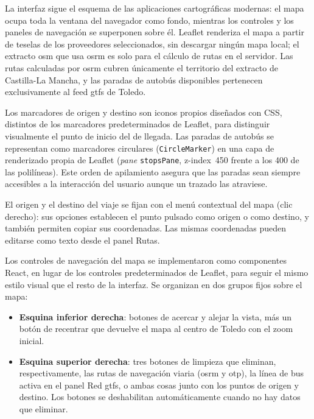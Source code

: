 La interfaz sigue el esquema de las aplicaciones cartográficas modernas: el mapa ocupa toda la ventana del navegador como fondo, mientras los controles y los paneles de navegación se superponen sobre él. Leaflet renderiza el mapa a partir de teselas de los proveedores seleccionados, sin descargar ningún mapa local; el extracto \gls{osm} que usa \gls{osrm} es solo para el cálculo de rutas en el servidor. Las rutas calculadas por \gls{osrm} cubren únicamente el territorio del extracto de Castilla-La Mancha, y las paradas de autobús disponibles pertenecen exclusivamente al feed \gls{gtfs} de Toledo.\newline

Los marcadores de origen y destino son iconos propios diseñados con CSS, distintos de los marcadores predeterminados de Leaflet, para distinguir visualmente el punto de inicio del de llegada. Las paradas de autobús se representan como marcadores circulares (\texttt{CircleMarker}) en una capa de renderizado propia de Leaflet (\textit{pane} \texttt{stopsPane}, z-index~450 frente a los 400 de las polilíneas). Este orden de apilamiento asegura que las paradas sean siempre accesibles a la interacción del usuario aunque un trazado las atraviese.\newline

El origen y el destino del viaje se fijan con el menú contextual del mapa (clic derecho): sus opciones establecen el punto pulsado como origen o como destino, y también permiten copiar sus coordenadas. Las mismas coordenadas pueden editarse como texto desde el panel Rutas.\newline

Los controles de navegación del mapa se implementaron como componentes React, en lugar de los controles predeterminados de Leaflet, para seguir el mismo estilo visual que el resto de la interfaz. Se organizan en dos grupos fijos sobre el mapa:

\begin{itemize}
  \item \textbf{Esquina inferior derecha}: botones de acercar y alejar la vista, más un botón de recentrar que devuelve el mapa al centro de Toledo con el zoom inicial.
  \item \textbf{Esquina superior derecha}: tres botones de limpieza que eliminan, respectivamente, las rutas de navegación viaria (\gls{osrm} y \gls{otp}), la línea de bus activa en el panel Red \gls{gtfs}, o ambas cosas junto con los puntos de origen y destino. Los botones se deshabilitan automáticamente cuando no hay datos que eliminar.
\end{itemize}

